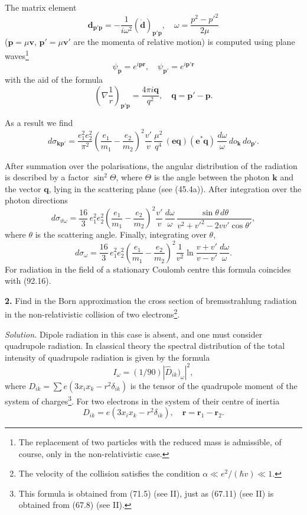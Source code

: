 The matrix element
\[
\mathbf{d}_{\mathbf{p}'\mathbf{p}} = -\frac{1}{i\omega^2}(\dot{\mathbf{d}})_{\mathbf{p}'\mathbf{p}}, \quad \omega = \frac{p^2 - p'^2}{2\mu}
\]
($\mathbf{p} = \mu\mathbf{v}$, $\mathbf{p}' = \mu\mathbf{v}'$ are the momenta of relative motion) is computed using plane waves\footnote{The replacement of two particles with the reduced mass is admissible, of course, only in the non-relativistic case.}
\[
\psi_\mathbf{p} = e^{i\mathbf{pr}}, \quad \psi_{\mathbf{p}'} = e^{i\mathbf{p}'\mathbf{r}}
\]
with the aid of the formula
\[
\left(\nabla\frac{1}{r}\right)_{\mathbf{p}'\mathbf{p}} = \frac{4\pi i\mathbf{q}}{q^2}, \quad \mathbf{q} = \mathbf{p}' - \mathbf{p}.
\]

As a result we find
\[
d\sigma_{\mathbf{kp}'} = \frac{e_1^2 e_2^2}{\pi^2}\left(\frac{e_1}{m_1} - \frac{e_2}{m_2}\right)^{\!2}\frac{v'}{v}\,\frac{\mu^2}{q^4}\,(\mathbf{eq})(\mathbf{e}^*\mathbf{q})\,\frac{d\omega}{\omega}\,do_\mathbf{k}\,do_{\mathbf{p}'}.
\]

After summation over the polarisations, the angular distribution of the radiation is described by a factor $\sin^2\Theta$, where $\Theta$ is the angle between the photon $\mathbf{k}$ and the vector $\mathbf{q}$, lying in the scattering plane (see (45.4a)). After integration over the photon directions
\[
d\sigma_{\vartheta\omega} = \frac{16}{3}\,e_1^2 e_2^2\left(\frac{e_1}{m_1} - \frac{e_2}{m_2}\right)^{\!2}\frac{v'}{v}\,\frac{d\omega}{\omega}\,\frac{\sin\theta\,d\theta}{v^2 + v'^2 - 2vv'\cos\theta'},
\]
where $\theta$ is the scattering angle. Finally, integrating over $\theta$,
\[
d\sigma_\omega = \frac{16}{3}\,e_1^2 e_2^2\left(\frac{e_1}{m_1} - \frac{e_2}{m_2}\right)^{\!2}\frac{1}{v^2}\ln\frac{v+v'}{v-v'}\,\frac{d\omega}{\omega}.
\]
For radiation in the field of a stationary Coulomb centre this formula coincides with (92.16).


\textbf{2.} Find in the Born approximation the cross section of bremsstrahlung radiation in the non-relativistic collision of two electrons\footnote{The velocity of the collision satisfies the condition $\alpha \ll e^2/(\hbar v) \ll 1$.}.

\emph{Solution.} Dipole radiation in this case is absent, and one must consider quadrupole radiation. In classical theory the spectral distribution of the total intensity of quadrupole radiation is given by the formula
\[
I_\omega = (1/90)|\hat{D}_{ik})_\omega|^2,
\]
where $D_{ik} = \sum e(3x_i x_k - r^2\delta_{ik})$ is the tensor of the quadrupole moment of the system of charges\footnote{This formula is obtained from (71.5) (see II), just as (67.11) (see II) is obtained from (67.8) (see II).}. For two electrons in the system of their centre of inertia
\[
D_{ik} = e(3x_i x_k - r^2\delta_{ik}), \quad \mathbf{r} = \mathbf{r}_1 - \mathbf{r}_2.
\]

